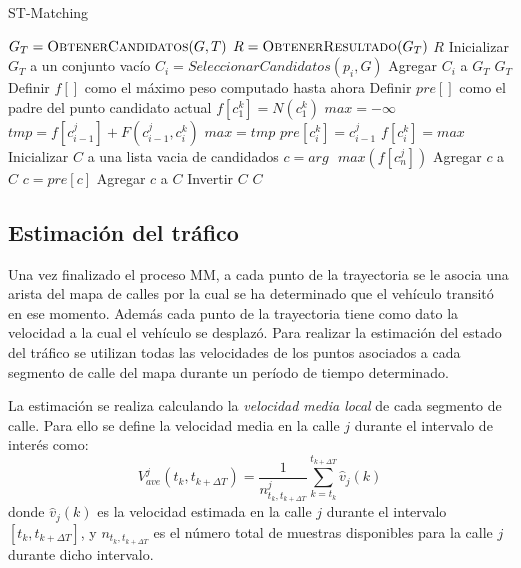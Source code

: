 \begin{algorithm}
\caption{ST-Matching}
\label{alg:st_matching}
\begin{algorithmic}[1]
	\State $G_T = \Call{ObtenerCandidatos}{G,T}$
	\State $R = \Call{ObtenerResultado}{G_T}$
	\State \Return $R$
\EndProcedure
\Statex
{}
	\State Inicializar $G_T$ a un conjunto vacío
		\State $C_i = SeleccionarCandidatos(p_i, G)$
		\State Agregar $C_i$ a $G_T$
	\EndFor
	\State \Return $G_T$
\EndFunction
\Statex
{}
	\State Definir $f[]$ como el máximo peso computado hasta ahora
	\State Definir $pre[]$ como el padre del punto candidato actual
		\State $f[c_1^k] = N(c_1^k)$
	\EndFor
			\State $max = -\infty$
				\State $tmp = f[c_{i-1}^j] + F(c_{i-1}^j,c_i^k)$
					\State $max = tmp$
					\State $pre[c_i^k] = c_{i-1}^j$
				\EndIf
				\State $f[c_i^k] = max$
			\EndFor
		\EndFor
	\EndFor
	\State Inicializar $C$ a una lista vacia de candidados
	\State $c = arg \text{ } max(f[c_n^j])$
		\State Agregar $c$ a $C$
		\State $c = pre[c]$
	\EndFor
	\State Agregar $c$ a $C$
	\State Invertir $C$
	\State \Return $C$
\EndFunction
\end{algorithmic}
\end{algorithm}

\subsection{Estimación del tráfico}
\label{estimacion_trafico}

Una vez finalizado el proceso MM, a cada punto de la trayectoria se le asocia una arista del mapa de calles por la cual se ha determinado que el vehículo transitó en ese momento. Además cada punto de la trayectoria tiene como dato la velocidad a la cual el vehículo se desplazó. Para realizar la estimación del estado del tráfico se utilizan todas las velocidades de los puntos asociados a cada segmento de calle del mapa durante un período de tiempo determinado.

La estimación se realiza calculando la \emph{velocidad media local} de cada segmento de calle. Para ello se define la velocidad media en la calle $j$ durante el intervalo de interés como:
\begin{equation}
\label{eq:velocidad_media}
{ V }_{ ave }^{ j }({ t }_{ k },{ t }_{ k+\Delta T })=\frac { 1 }{ { n }_{ { t }_{ k },{ t }_{ k+\Delta T } }^{ j } } \sum_{ k={ t }_{ k } }^{ { t }_{ k+\Delta T } }{ \hat { { v } } _{ j }(k) }
\end{equation}
donde ${ \hat { { v } } _{ j }(k) }$ es la velocidad estimada en la calle $j$ durante el intervalo $\left[ { t }_{ k },{ t }_{ k+\Delta T } \right] $, y ${ { n }_{ { t }_{ k },{ t }_{ k+\Delta T }}}$ es el número total de muestras disponibles para la calle $j$ durante dicho intervalo.

